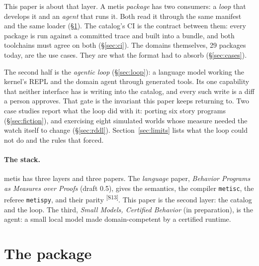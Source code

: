 \documentclass[11pt]{article}
\newcommand{\metisc}{\texttt{metisc}}
\newcommand{\metispy}{\texttt{metispy}}
\newcommand{\src}[1]{\textsuperscript{[#1]}}
\begin{document}
This paper is about that layer. A metis \emph{package} has two consumers:
a \emph{loop} that develops it and an \emph{agent} that runs it. Both read
it through the same manifest and the same loader (\S\ref{sec:package}).
The catalog's CI is the contract between them: every package is run
against a committed trace and built into a bundle, and both toolchains
must agree on both (\S\ref{sec:ci}). The domains themselves, 29 packages
today, are the use cases. They are what the format had to absorb
(\S\ref{sec:cases}).

The second half is the \emph{agentic loop} (\S\ref{sec:loop}): a language
model working the kernel's REPL and the domain agent through generated
tools. Its one capability that neither interface has is writing into the
catalog, and every such write is a diff a person approves. That gate is
the invariant this paper keeps returning to. Two case studies report what
the loop did with it: porting six story programs (\S\ref{sec:fiction}),
and exercising eight simulated worlds whose measure needed the watch
itself to change (\S\ref{sec:rddl}). Section~\ref{sec:limits} lists what
the loop could not do and the rules that forced.

\paragraph{The stack.} metis has three layers and three papers. The
\emph{language} paper, \emph{Behavior Programs as Measures over Proofs}
(draft 0.5), gives the semantics, the compiler \metisc, the referee
\metispy, and their parity \src{S13}. This paper is the second layer: the
catalog and the loop. The third, \emph{Small Models, Certified Behavior}
(in preparation), is the agent: a small local model made
domain-competent by a certified runtime.

\section{The package}\label{sec:package}
\end{document}
